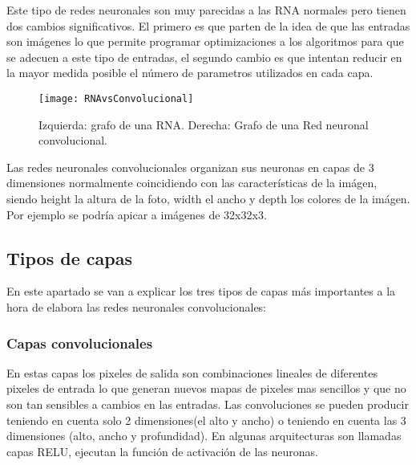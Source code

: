 Este tipo de redes neuronales son muy parecidas a las RNA normales pero tienen dos cambios significativos. El primero es que parten de la idea de que las entradas son imágenes lo que permite programar optimizaciones a los algoritmos para que se adecuen a este tipo de entradas, el segundo cambio es que intentan reducir en la mayor medida posible el número de parametros utilizados en cada capa.\cite{redesNeuronalesConvolucionales}

\begin{figure}[h]
    \begin{center}%
        \begin{center}%
          \texttt{[image: RNAvsConvolucional]}%
          \caption{Izquierda: grafo de una RNA. Derecha: Grafo de una Red neuronal convolucional.}%
          \label{figRNAvsConvolucional}%
        \end{center}%
  	\end{center}%
\end{figure}%

Las redes neuronales convolucionales organizan sus neuronas en capas de 3 dimensiones normalmente coincidiendo con las características de la imágen, siendo height la altura de la foto, width el ancho y depth los colores de la imágen. Por ejemplo se podría apicar a imágenes de 32x32x3.

\subsection{Tipos de capas}

En este apartado se van a explicar los tres tipos de capas más importantes a la hora de elabora las redes neuronales convolucionales:
\subsubsection{Capas convolucionales}

En estas capas los pixeles de salida son combinaciones lineales de diferentes pixeles de entrada lo que generan nuevos mapas de pixeles mas sencillos y que no son tan sensibles a cambios en las entradas.\cite{redesConvolucionales} Las convoluciones se pueden producir teniendo en cuenta solo 2 dimensiones(el alto y ancho) o teniendo en cuenta las 3 dimensiones (alto, ancho y profundidad). En algunas arquitecturas son llamadas capas RELU, ejecutan la función de activación de las neuronas.

